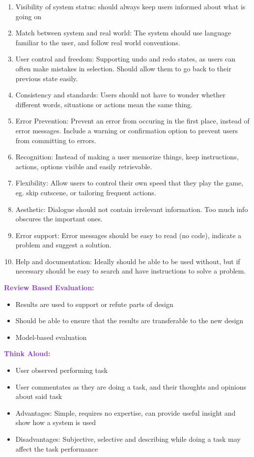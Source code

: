 \documentclass[a4paper,10pt]{article}
\begin{document}
\begin{enumerate}
\item Visibility of system status: should always keep users informed about what is going on 
\item Match between system and real world: The system should use language familiar to the user, and follow real world conventions. 
\item User control and freedom: Supporting undo and redo states, as users can often make mistakes in selection. Should allow them to go back to their previous state easily. 
\item Consistency and standards: Users should not have to wonder whether different words, situations or actions mean the same thing. 
\item Error Prevention: Prevent an error from occuring in the first place, instead of error messages. Include a warning or confirmation option to prevent users from committing to errors. 
\item Recognition: Instead of making a user memorize things, keep instructions, actions, options visible and easily retrievable. 
\item Flexibility: Allow users to control their own speed that they play the game, eg. skip cutscene, or tailoring frequent actions.
\item Aesthetic: Dialogue should not contain irrelevant information. Too much info obscures the important ones.
\item Error support: Error messages should be easy to read (no code), indicate a problem and suggest a solution.
\item Help and documentation: Ideally should be able to be used without, but if necessary should be easy to search and have instructions to solve a problem.   
\end{enumerate}
\newpage 
\noindent \textcolor{BlueViolet}{\textbf{Review Based Evaluation:}}
\renewcommand{\labelitemi}{\textperiodcentered}
\begin{itemize}
\item Results are used to support or refute parts of design 
\item Should be able to ensure that the results are transferable to the new design 
\item Model-based evaluation
\end{itemize}
\textcolor{BlueViolet}{\textbf{Think Aloud:}}
\renewcommand{\labelitemi}{\textperiodcentered}
\begin{itemize}
\item User observed performing task 
\item User commentates as they are doing a task, and their thoughts and opinions about said task
\item Advantages: Simple, requires no expertise, can provide useful insight and show how a system is used 
\item Disadvantages: Subjective, selective and describing while doing a task may affect the task performance
\end{itemize}
\end{document}
